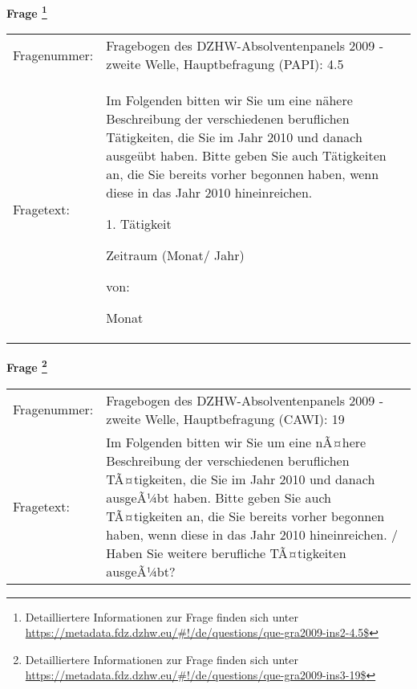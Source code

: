 				\vspace*{0.5cm}
                \noindent\textbf{Frage
	                \footnote{Detailliertere Informationen zur Frage finden sich unter
		              \url{https://metadata.fdz.dzhw.eu/\#!/de/questions/que-gra2009-ins2-4.5$}}}\\
				\begin{tabularx}{\hsize}{@{}lX}
					Fragenummer: &
					  Fragebogen des DZHW-Absolventenpanels 2009 - zweite Welle, Hauptbefragung (PAPI):
					  4.5
 \\
					Fragetext: & Im Folgenden bitten wir Sie um eine nähere Beschreibung der verschiedenen beruflichen Tätigkeiten, die Sie im Jahr 2010 und danach ausgeübt haben. Bitte geben Sie auch Tätigkeiten an, die Sie bereits vorher begonnen haben, wenn diese in das Jahr 2010 hineinreichen.\par  1. Tätigkeit\par  Zeitraum (Monat/ Jahr)\par  von:\par  Monat \\
				\end{tabularx}
				\vspace*{0.5cm}
                \noindent\textbf{Frage
	                \footnote{Detailliertere Informationen zur Frage finden sich unter
		              \url{https://metadata.fdz.dzhw.eu/\#!/de/questions/que-gra2009-ins3-19$}}}\\
				\begin{tabularx}{\hsize}{@{}lX}
					Fragenummer: &
					  Fragebogen des DZHW-Absolventenpanels 2009 - zweite Welle, Hauptbefragung (CAWI):
					  19
 \\
					Fragetext: & Im Folgenden bitten wir Sie um eine nÃ¤here Beschreibung der verschiedenen beruflichen TÃ¤tigkeiten, die Sie im Jahr 2010 und danach ausgeÃ¼bt haben. Bitte geben Sie auch TÃ¤tigkeiten an, die Sie bereits vorher begonnen haben, wenn diese in das Jahr 2010 hineinreichen. / Haben Sie weitere berufliche TÃ¤tigkeiten ausgeÃ¼bt? \\
				\end{tabularx}





